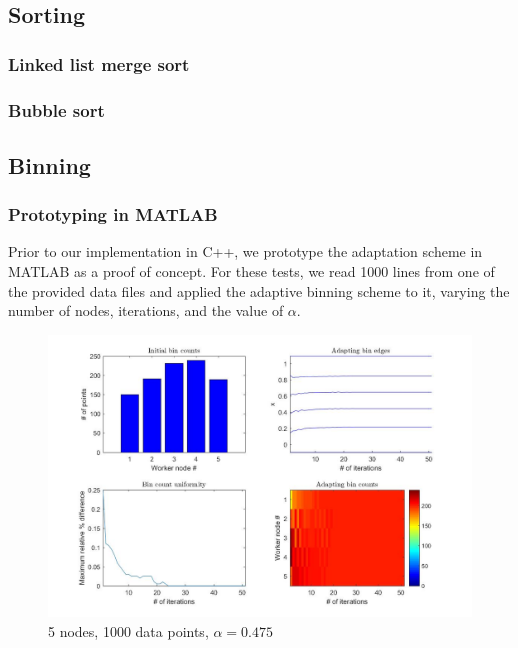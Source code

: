 \documentclass{article}
\begin{document}
\subsection{Sorting}
\subsubsection{Linked list merge sort}
\subsubsection{Bubble sort}

\subsection{Binning}


\subsubsection{Prototyping in MATLAB}
Prior to our implementation in C++, we prototype the adaptation scheme in MATLAB as a proof of concept. For these tests, we read 1000 lines from one of the provided data files and applied the adaptive binning scheme to it, varying the number of nodes, iterations, and the value of $\alpha$.
\begin{figure}[!htb]
	\centering
	\vspace{-5pt}
	\includegraphics[scale = 0.25]{AdaptiveBinning_5Nodes_1000Lines_0475alpha}
	\vspace{-10pt}
	\caption{5 nodes, 1000 data points, $\alpha = 0.475$}
	\label{5,0.475}
\end{figure}
\end{document}
